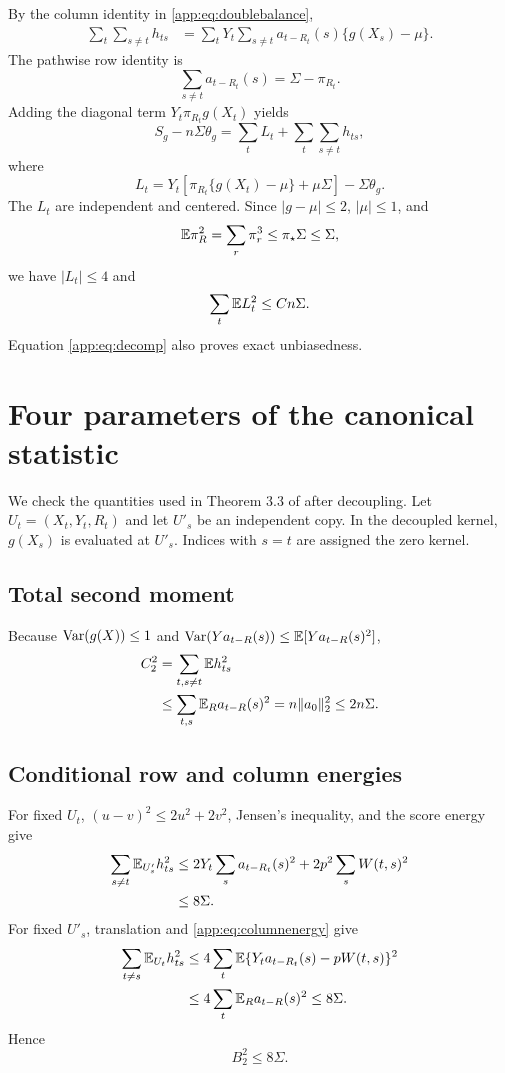 By the column identity in \eqref{app:eq:doublebalance},
\begin{align*}
 \sum_{t}\sum_{s\ne t}h_{ts}
 &=\sum_tY_t\sum_{s\ne t}a_{t-R_t}(s)\{g(X_s)-\mu\}.
\end{align*}
The pathwise row identity is
\[
 \sum_{s\ne t}a_{t-R_t}(s)=\Sigma-\pi_{R_t}.
\]
Adding the diagonal term $Y_t\pi_{R_t}g(X_t)$ yields
\begin{equation}
 S_g-n\Sigma\theta_g
 =\sum_tL_t+\sum_t\sum_{s\ne t}h_{ts},
 \label{app:eq:decomp}
\end{equation}
where
\[
 L_t=Y_t[\pi_{R_t}\{g(X_t)-\mu\}+\mu\Sigma]-\Sigma\theta_g.
\]
The $L_t$ are independent and centered. Since $|g-\mu|\le2$, $|\mu|\le1$, and
\[
 \mathbb E\pi_R^2=\sum_r\pi_r^3\le\pi_\star\Sigma\le\Sigma,
\]
we have $|L_t|\le4$ and
\begin{equation}
 \sum_t\mathbb E L_t^2\le Cn\Sigma.
 \label{app:eq:linearvariance}
\end{equation}
Equation \eqref{app:eq:decomp} also proves exact unbiasedness.

\section{Four parameters of the canonical statistic}

We check the quantities used in Theorem 3.3 of \citet{gine2000exponential} after decoupling. Let $U_t=(X_t,Y_t,R_t)$ and let $U'_s$ be an independent copy. In the decoupled kernel, $g(X_s)$ is evaluated at $U'_s$. Indices with $s=t$ are assigned the zero kernel.

\subsection{Total second moment}

Because $\operatorname{Var}(g(X))\le1$ and $\operatorname{Var}(Y a_{t-R}(s))\le\mathbb E[Y a_{t-R}(s)^2]$,
\begin{align}
 C_2^2
 &=\sum_{t,s\ne t}\mathbb E h_{ts}^2\\
 &\le \sum_{t,s}\mathbb E_R a_{t-R}(s)^2
 =n\|a_0\|_2^2\le2n\Sigma.
 \label{app:eq:C}
\end{align}

\subsection{Conditional row and column energies}

For fixed $U_t$, $(u-v)^2\le2u^2+2v^2$, Jensen's inequality, and the score energy give
\begin{align*}
 \sum_{s\ne t}\mathbb E_{U'_s}h_{ts}^2
 &\le2Y_t\sum_sa_{t-R_t}(s)^2+2p^2\sum_sW(t,s)^2\\
 &\le8\Sigma.
\end{align*}
For fixed $U'_s$, translation and \eqref{app:eq:columnenergy} give
\begin{align*}
 \sum_{t\ne s}\mathbb E_{U_t}h_{ts}^2
 &\le4\sum_t\mathbb E\{Y_ta_{t-R_t}(s)-pW(t,s)\}^2\\
 &\le4\sum_t\mathbb E_Ra_{t-R}(s)^2\le8\Sigma.
\end{align*}
Hence
\begin{equation}
 B_2^2\le8\Sigma.
 \label{app:eq:B}
\end{equation}

